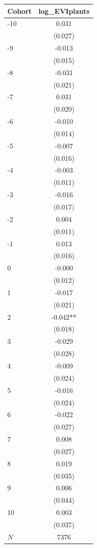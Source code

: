 {
\def\sym#1{\ifmmode^{#1}\else\(^{#1}\)\fi}
\begin{tabular}{l*{1}{c}}
\toprule
Cohort    &log\_EVIplants   \\
\midrule
-10       &    0.031   \\
          &  (0.027)   \\
-9        &   -0.013   \\
          &  (0.015)   \\
-8        &   -0.031   \\
          &  (0.021)   \\
-7        &    0.031   \\
          &  (0.020)   \\
-6        &   -0.010   \\
          &  (0.014)   \\
-5        &   -0.007   \\
          &  (0.016)   \\
-4        &   -0.003   \\
          &  (0.011)   \\
-3        &   -0.016   \\
          &  (0.017)   \\
-2        &    0.004   \\
          &  (0.011)   \\
-1        &    0.013   \\
          &  (0.016)   \\
0         &   -0.000   \\
          &  (0.012)   \\
1         &   -0.017   \\
          &  (0.021)   \\
2         &   -0.042** \\
          &  (0.018)   \\
3         &   -0.029   \\
          &  (0.028)   \\
4         &   -0.009   \\
          &  (0.024)   \\
5         &   -0.016   \\
          &  (0.024)   \\
6         &   -0.022   \\
          &  (0.027)   \\
7         &    0.008   \\
          &  (0.027)   \\
8         &    0.019   \\
          &  (0.035)   \\
9         &    0.006   \\
          &  (0.044)   \\
10        &    0.003   \\
          &  (0.037)   \\
\midrule
\(N\)     &     7376   \\
\bottomrule
\end{tabular}
}

